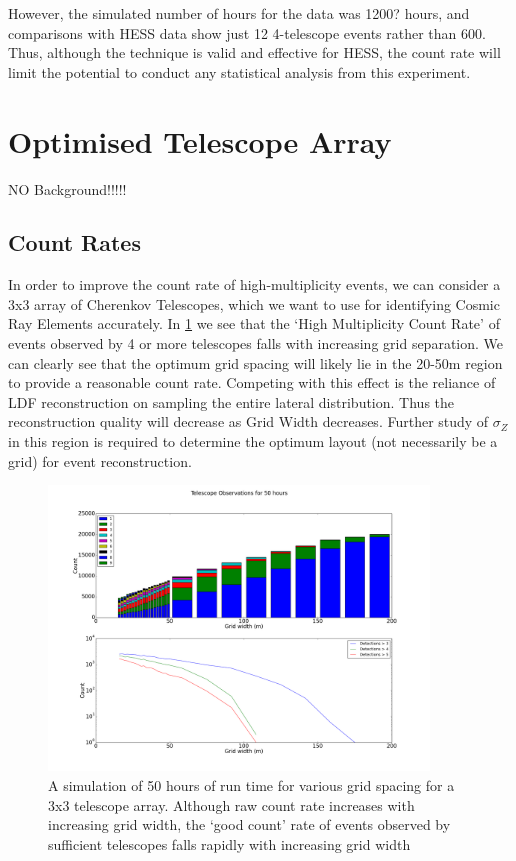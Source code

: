 \documentclass{article}
\begin{document}
However, the simulated number of hours for the data was 1200? hours, and comparisons with HESS data show just 12 4-telescope events rather than 600. Thus, although the technique is valid and effective for HESS, the count rate will limit the potential to conduct any statistical analysis from this experiment.

\section{Optimised Telescope Array}
NO Background!!!!!
\subsection{Count Rates}

In order to improve the count rate of high-multiplicity events, we can consider a 3x3 array of Cherenkov Telescopes, which we want to use for identifying Cosmic Ray Elements accurately. In \ref{fig:optmiselayout} we see that the \textquoteleft High Multiplicity Count Rate' of events observed by 4 or more telescopes falls with increasing grid separation. We can clearly see that the optimum grid spacing will likely lie in the 20-50m region to provide a reasonable count rate. Competing with this effect is the reliance of LDF reconstruction on sampling the entire lateral distribution. Thus the reconstruction quality will decrease as Grid Width decreases. Further study of $\sigma_{Z}$ in this region is required to determine the optimum layout (not necessarily be a grid) for event reconstruction. 

\begin{figure}
\begin{center}
\includegraphics[width=0.9\textwidth]{optimiselayout}
\caption{A simulation of 50 hours of run time for various grid spacing for a 3x3 telescope array. Although raw count rate increases with increasing grid width, the \textquoteleft good count' rate of events observed by sufficient telescopes falls rapidly with increasing grid width}
\label{fig:optmiselayout}
\end{center}
\end{figure}
\end{document}
